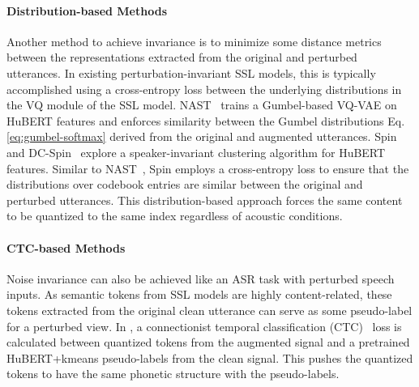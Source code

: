 \paragraph{Distribution-based Methods}
Another method to achieve invariance is to minimize some distance metrics between the representations extracted from the original and perturbed utterances.
In existing perturbation-invariant SSL models, this is typically accomplished using a cross-entropy loss between the underlying distributions in the VQ module of the SSL model.
NAST~\cite{messica2024nast} trains a Gumbel-based VQ-VAE on HuBERT features and enforces similarity between the Gumbel distributions Eq.\eqref{eq:gumbel-softmax} derived from the original and augmented utterances.
Spin~\cite{chang23_interspeech} and DC-Spin~\cite{chang2024dc} explore a speaker-invariant clustering algorithm for HuBERT features.
Similar to NAST~\cite{messica2024nast}, Spin employs a cross-entropy loss to ensure that the distributions over codebook entries are similar between the original and perturbed utterances.
This distribution-based approach forces the same content to be quantized to the same index regardless of acoustic conditions.

\paragraph{CTC-based Methods}
Noise invariance can also be achieved like an ASR task with perturbed speech inputs.
As semantic tokens from SSL models are highly content-related, these tokens extracted from the original clean utterance can serve as some pseudo-label for a perturbed view.
In \cite{gat2023augmentation}, a connectionist temporal classification (CTC)~\cite{ctc} loss is calculated between quantized tokens from the augmented signal and a pretrained HuBERT+kmeans pseudo-labels from the clean signal.
This pushes the quantized tokens to have the same phonetic structure with the pseudo-labels.

